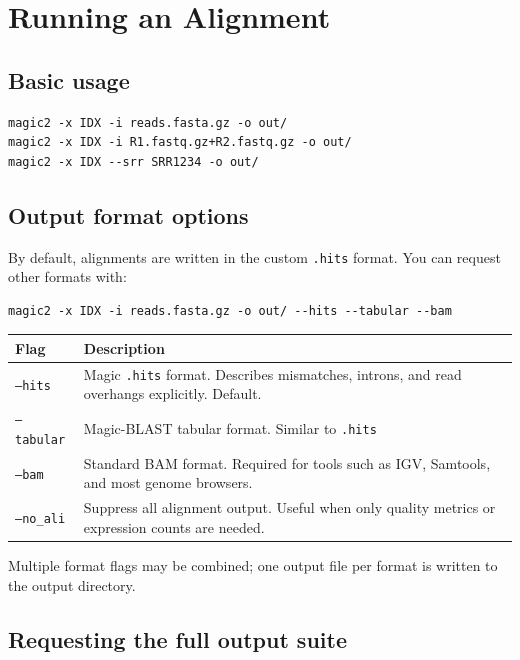 \documentclass[11pt]{article}
\newcommand{\code}[1]{\texttt{#1}}
\begin{document}
\section{Running an Alignment}

\subsection{Basic usage}

\begin{lstlisting}
magic2 -x IDX -i reads.fasta.gz -o out/
magic2 -x IDX -i R1.fastq.gz+R2.fastq.gz -o out/
magic2 -x IDX --srr SRR1234 -o out/
\end{lstlisting}

\subsection{Output format options}

By default, alignments are written in the custom \code{.hits} format.
You can request other formats with:
\begin{lstlisting}
magic2 -x IDX -i reads.fasta.gz -o out/ --hits --tabular --bam
\end{lstlisting}

\begin{center}
\begin{tabular}{lp{10cm}}
\toprule
\textbf{Flag} & \textbf{Description} \\
\midrule
\code{--hits}    & Magic \code{.hits} format.  Describes mismatches,
                   introns, and read overhangs explicitly. Default. \\
\code{--tabular} & Magic-BLAST tabular format.  Similar to \code{.hits}\\
\code{--bam}     & Standard BAM format.  Required for tools such as
                   IGV, Samtools, and most genome browsers.\\
\code{--no\_ali} & Suppress all alignment output.  Useful when only
                   quality metrics or expression counts are needed. \\
\bottomrule
\end{tabular}
\end{center}

Multiple format flags may be combined; one output file per format is
written to the output directory.

\subsection{Requesting the full output suite}
\end{document}
